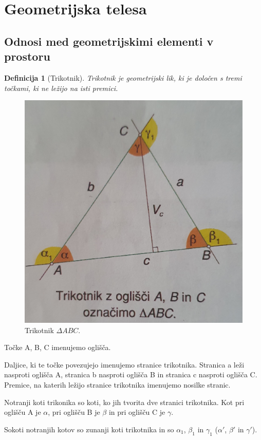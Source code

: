 \documentclass{article}
\newtheorem{definicija}{Definicija}[subsection]
\begin{document}
\pagestyle{empty}

\section{ Geometrijska telesa }
\subsection{ Odnosi med geometrijskimi elementi v prostoru }

\begin{definicija}[Trikotnik]
    Trikotnik je geometrijski lik, ki je določen s tremi točkami, ki ne ležijo na isti premici. 
\end{definicija}

\begin{figure}[h]
    \includegraphics[width=0.4\linewidth]{trikotnik.png}
    \centering
    \caption{Trikotnik $\Delta ABC$.}
\end{figure}

Točke A, B, C imenujemo oglišča.

Daljice, ki te točke povezujejo imenujemo stranice trikotnika.
Stranica a leži nasproti oglišča A, stranica b nasproti oglišča B in stranica c nasproti oglišča C. Premice, na katerih ležijo stranice trikotnika imenujemo nosilke stranic.

Notranji koti trikonika so koti, ko jih tvorita dve stranici trikotnika.
Kot pri oglišču A  je $\alpha$, pri oglišču B je $\beta$ in pri oglišču C je $\gamma$.

Sokoti notranjih kotov so zunanji koti trikotnika in so $\alpha_1$, $\beta_1$ in $\gamma_1$ ($\alpha'$, $\beta'$ in $\gamma'$).
\end{document}

